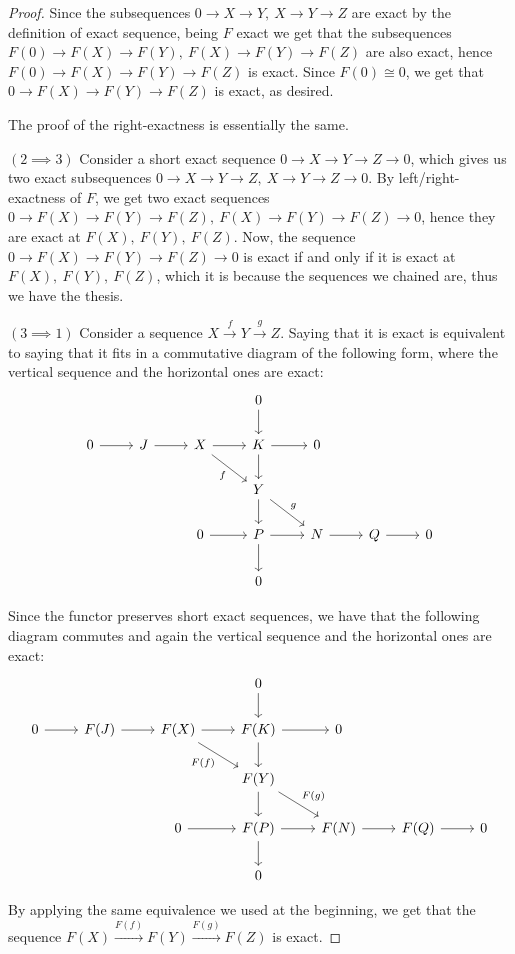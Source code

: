 \documentclass{article}
\begin{document}
\begin{proof}
	Since the subsequences $0\rightarrow X\rightarrow Y,\ X\rightarrow Y\rightarrow Z$ are exact by the definition of exact sequence, being $F$ exact we get that the subsequences $F(0)\rightarrow F(X)\rightarrow F(Y),\ F(X)\rightarrow F(Y)\rightarrow F(Z)$ are also exact, hence $F(0)\rightarrow F(X)\rightarrow F(Y)\rightarrow F(Z)$ is exact. Since $F(0)\cong 0$, we get that $0\rightarrow F(X)\rightarrow F(Y)\rightarrow F(Z)$ is exact, as desired.
	
	The proof of the right-exactness is essentially the same.
	
	$(2\implies 3)$ Consider a short exact sequence $0\rightarrow X\rightarrow Y\rightarrow Z\rightarrow 0$, which gives us two exact subsequences $0\rightarrow X\rightarrow Y\rightarrow Z,\ X\rightarrow Y\rightarrow Z\rightarrow 0$. By left/right-exactness of $F$, we get two exact sequences $0\rightarrow F(X)\rightarrow F(Y)\rightarrow F(Z),\ F(X)\rightarrow F(Y)\rightarrow F(Z)\rightarrow 0$, hence they are exact at $F(X),\ F(Y),\ F(Z)$. Now, the sequence $0\rightarrow F(X)\rightarrow F(Y)\rightarrow F(Z)\rightarrow 0$ is exact if and only if it is exact at $F(X),\ F(Y),\ F(Z)$, which it is because the sequences we chained are, thus we have the thesis.
	
	$(3\implies 1)$ Consider a sequence $X\xrightarrow{f} Y\xrightarrow{g} Z$. Saying that it is exact is equivalent to saying that it fits in a commutative diagram of the following form, where the vertical sequence and the horizontal ones are exact:
	\[
		\begin{tikzcd}
			&&& 0\arrow{d} \\
			0\arrow{r}
			& J\arrow{r}
			& X\arrow{r}\arrow[swap]{dr}{f}
			& K\arrow{r}\arrow{d}
			& 0 \\
			&&& Y\arrow{d}\arrow{dr}{g} \\
			&& 0\arrow{r}
			& P\arrow{r}\arrow{d}
			& N\arrow{r}
			& Q\arrow{r}
			& 0 \\
			&&& 0
		\end{tikzcd}
	\]
	
	Since the functor preserves short exact sequences, we have that the following diagram commutes and again the vertical sequence and the horizontal ones are exact:
	\[
		\begin{tikzcd}
			&&& 0\arrow{d} \\
			0\arrow{r}
			& F(J)\arrow{r}
			& F(X)\arrow{r}\arrow[swap]{dr}{F(f)}
			& F(K)\arrow{r}\arrow{d}
			& 0 \\
			&&& F(Y)\arrow{d}\arrow{dr}{F(g)} \\
			&& 0\arrow{r}
			& F(P)\arrow{r}\arrow{d}
			& F(N)\arrow{r}
			& F(Q)\arrow{r}
			& 0 \\
			&&& 0
		\end{tikzcd}
	\]
	
	By applying the same equivalence we used at the beginning, we get that the sequence $F(X)\xrightarrow{F(f)} F(Y)\xrightarrow{F(g)} F(Z)$ is exact.
\end{proof}
	
\end{document}
